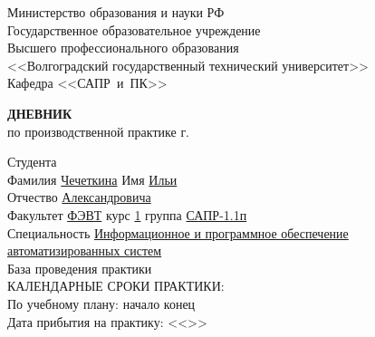 \begin{titlepage}
    \begin{center}
        Министерство образования и науки РФ \\
        Государственное образовательное учреждение\\
        Высшего профессионального образования\\
        <<Волгоградский государственный технический университет>>\\
        Кафедра <<САПР~и~ПК>>
    \end{center}
    \vspace{0.5cm}
    \begin{center}
        \large \textbf{ДНЕВНИК} \\
        по производственной практике \the\year г.
    \end{center}
    \begin{flushleft}
        Студента\\
        Фамилия \underline{Чечеткина\hspace{2.6cm}}
        Имя \underline{Ильи\hspace{3.5cm}}\\
        Отчество \underline{Александровича\hspace{1.33cm}}\\
        Факультет \underline{ФЭВТ\hspace{3.23cm}} курс \underline{1\hspace{.8cm}}
        группа \underline{САПР-1.1п\hspace{2.2cm}}\\
        \vspace{1cm}
        Специальность \underline{Информационное и программное обеспечение\hspace{3.35cm}}\\
        \underline{автоматизированных систем\hspace{10.65cm}}\\
        База проведения практики \underline{\hspace{10.8cm}}\\
        \vspace{1cm}
        КАЛЕНДАРНЫЕ СРОКИ ПРАКТИКИ:\\
        По учебному плану: \hspace{0.2cm} начало \underline{\hspace{4.3cm}}
        конец \underline{\hspace{4.3cm}}\\
        Дата прибытия на практику: <<\underline{\hspace{1cm}}>> \underline{\hspace{3cm}}

\end{flushleft}
\end{titlepage}
